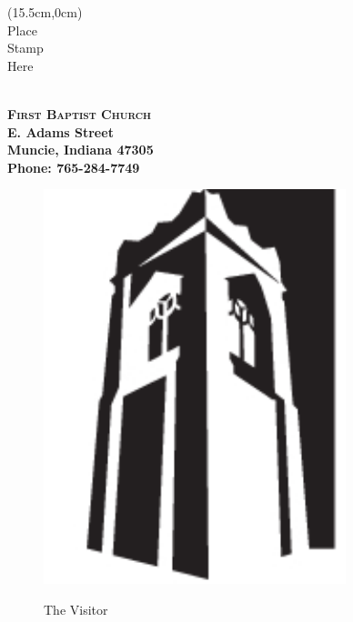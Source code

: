 
  
\thispagestyle{plain}

\begin{textblock*}{.6in}(15.5cm,0cm)  
  \centering \ \\ Place \\ Stamp \\ Here \\ \ \\
\end{textblock*}


  \noindent \bfseries \textsc{First Baptist Church} \\
   E. Adams Street \\
  Muncie, Indiana 47305 \\
  Phone: 765-284-7749


\begin{figure}[ht]
  {\begin{minipage}[t]{.5in}
    \vspace{2.5in}\includegraphics[height=.5in]{visitor-logo}
  \end{minipage}}
  {\begin{minipage}[t]{1.5in}
    \vspace{2.5in} \fontsize{20}{15}\selectfont The Visitor \\
     \fontsize{12}{9}\textsc{\month \ \year}
  \end{minipage}}
\end{figure}
                
\vspace{.5in}